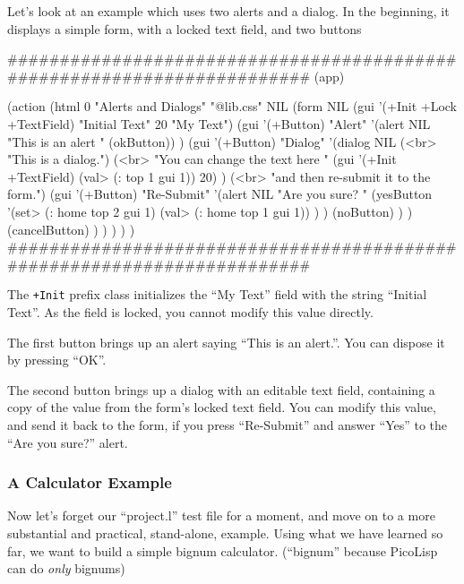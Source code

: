Let's look at an example which uses two alerts and a dialog. In the
beginning, it displays a simple form, with a locked text field, and two
buttons


\begin{wideverbatim}
########################################################################
(app)

(action
   (html 0 "Alerts and Dialogs" "@lib.css" NIL
      (form NIL
         (gui '(+Init +Lock +TextField) "Initial Text" 20 "My Text")
         (gui '(+Button) "Alert"
            '(alert NIL "This is an alert " (okButton)) )
         (gui '(+Button) "Dialog"
            '(dialog NIL
               (<br> "This is a dialog.")
               (<br>
                  "You can change the text here "
                  (gui '(+Init +TextField) (val> (: top 1 gui 1)) 20) )
               (<br> "and then re-submit it to the form.")
               (gui '(+Button) "Re-Submit"
                  '(alert NIL "Are you sure? "
                     (yesButton
                        '(set> (: home top 2 gui 1)
                           (val> (: home top 1 gui 1)) ) )
                     (noButton) ) )
               (cancelButton) ) ) ) ) )
########################################################################
\end{wideverbatim}

The \texttt{+Init} prefix class initializes the ``My Text'' field with the string
``Initial Text''. As the field is locked, you cannot modify this value
directly.

The first button brings up an alert saying ``This is an alert.''. You can
dispose it by pressing ``OK''.

The second button brings up a dialog with an editable text field,
containing a copy of the value from the form's locked text field. You
can modify this value, and send it back to the form, if you press
``Re-Submit'' and answer ``Yes'' to the ``Are you sure?'' alert.


\subsubsection{ A Calculator Example}
\label{sec:appl-devel-a-calculator-example}%

Now let's forget our ``project.l'' test file for a moment, and move on to
a more substantial and practical, stand-alone, example. Using what we
have learned so far, we want to build a simple bignum calculator.
(``bignum'' because PicoLisp can do \emph{only} bignums)

